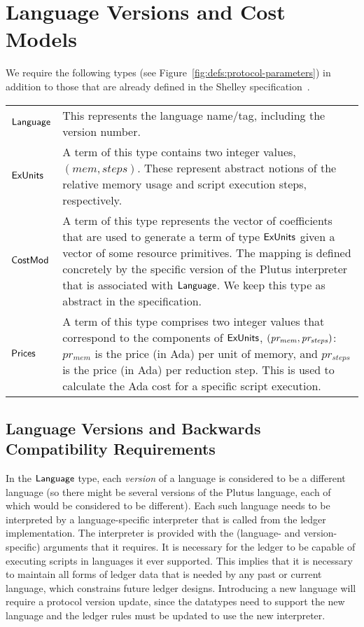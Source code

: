 \section{Language Versions and Cost Models}
\label{sec:protocol-parameters}

We require the following types (see Figure~\ref{fig:defs:protocol-parameters})
in addition to those that are already defined in the Shelley specification~\cite{shelley_spec}.

\vspace{12pt}
\begin{tabular}{lp{5in}}
  $\mathsf{Language}$ &
  This represents the language name/tag, including the
  version number.
  \\
  $\mathsf{ExUnits}$ &
  A term of this type contains two integer values,
  $(mem, steps)$.
  These represent abstract notions of the relative memory usage and script execution steps,
  respectively.
  \\
  $\mathsf{CostMod}$ &
  A term of this type represents the vector of coefficients that are used to generate
  a term of type $\mathsf{ExUnits}$ given a vector of some resource primitives. The mapping is defined
  concretely by the specific version of the Plutus interpreter that is associated with $\mathsf{Language}$.
  We keep this type as abstract in the specification.
  \\
  $\mathsf{Prices}$ &
  A term of this type comprises two integer values that correspond to the components of $\mathsf{ExUnits}$,
  $\mathit{(pr_{mem}, pr_{steps})}$:
  $pr_{mem}$ is the price (in Ada) per unit of memory, and $pr_{steps}$ is the price (in Ada) per
  reduction step. This is used to calculate the Ada cost for a specific script execution.
\end{tabular}

\subsection{Language Versions and Backwards Compatibility Requirements}
\label{sec:versions}

In the $\mathsf{Language}$ type, each \emph{version} of a language is considered to be a different language (so there might be several versions of the Plutus language, each of which would be considered to
be different).
Each such language needs to be interpreted by a language-specific interpreter that is called from the ledger implementation.
The interpreter is provided with the (language- and version-specific) arguments that it requires.
It is necessary for the ledger to be capable of executing scripts in languages it ever supported.
This implies that it is necessary to maintain all forms of ledger
data that is needed by any past or current language, which constrains future ledger designs.
Introducing a new language will require a protocol version update, since the datatypes need to support the new language and the ledger rules must be updated to use the new interpreter.

